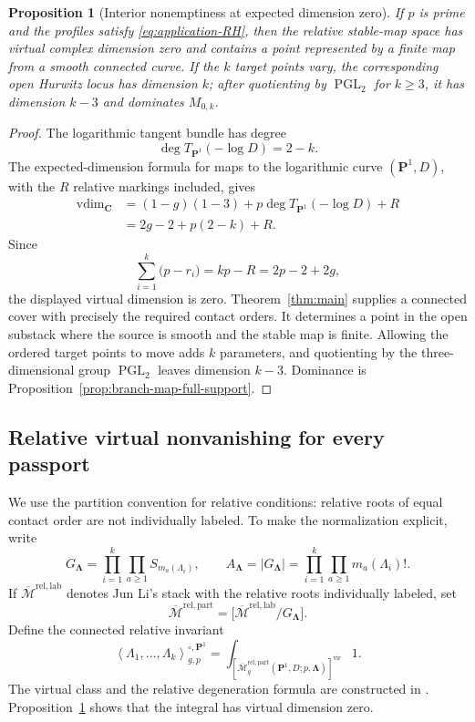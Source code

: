 \documentclass[10pt,a4paper]{amsart}
\newtheorem{proposition}[theorem]{Proposition}
\numberwithin{equation}{section}
\begin{document}
\begin{proposition}[Interior nonemptiness at expected dimension zero]
\label{prop:relative-interior}
If $p$ is prime and the profiles satisfy
\eqref{eq:application-RH}, then the relative stable-map space has virtual
complex dimension zero and contains a point represented by a finite map
from a smooth connected curve.  If the $k$ target points vary, the
corresponding open Hurwitz locus has dimension $k$; after quotienting by
$\operatorname{PGL}_2$ for $k\geq3$, it has dimension $k-3$ and dominates
$M_{0,k}$.
\end{proposition}

\begin{proof}
The logarithmic tangent bundle has degree
\[
 \deg T_{\mathbf P^1}(-\log D)=2-k.
\]
The expected-dimension formula for maps to the logarithmic curve
$(\mathbf P^1,D)$, with the $R$ relative markings included, gives
\begin{align*}
 \operatorname{vdim}_{\mathbf C}
 &= (1-g)(1-3)+p\deg T_{\mathbf P^1}(-\log D)+R\\
 &=2g-2+p(2-k)+R.
\end{align*}
Since
\[
 \sum_{i=1}^k\bigl(p-r_i\bigr)=kp-R=2p-2+2g,
\]
the displayed virtual dimension is zero.  Theorem~\ref{thm:main} supplies a
connected cover with precisely the required contact orders.  It determines
a point in the open substack where the source is smooth and the stable map
is finite.  Allowing the ordered target points to move adds $k$ parameters,
and quotienting by the three-dimensional group $\operatorname{PGL}_2$
leaves dimension $k-3$.  Dominance is
Proposition~\ref{prop:branch-map-full-support}.
\end{proof}

\subsection{Relative virtual nonvanishing for every passport}

We use the partition convention for relative conditions: relative roots of
equal contact order are not individually labeled.  To make the
normalization explicit, write
\[
 G_{\boldsymbol\Lambda}
 =\prod_{i=1}^k\prod_{a\geq1}S_{m_a(\Lambda_i)},
 \qquad
 A_{\boldsymbol\Lambda}=|G_{\boldsymbol\Lambda}|
 =\prod_{i=1}^k\prod_{a\geq1}m_a(\Lambda_i)!.
\]
If $\overline{\mathcal M}^{\mathrm{rel,lab}}$ denotes Jun Li's stack with
the relative roots individually labeled, set
\[
 \overline{\mathcal M}^{\mathrm{rel,part}}
 =\bigl[\overline{\mathcal M}^{\mathrm{rel,lab}}/
        G_{\boldsymbol\Lambda}\bigr].
\]
Define the connected relative invariant
\begin{equation}\label{eq:relative-invariant-definition}
 \left\langle\Lambda_1,\ldots,\Lambda_k
 \right\rangle^{\circ,\mathbf P^1}_{g,p}
 =\int_{[\overline{\mathcal M}^{\mathrm{rel,part}}_{g}
   (\mathbf P^1,D;p,\boldsymbol\Lambda)]^{\mathrm{vir}}}1.
\end{equation}
The virtual class and the relative degeneration formula are constructed in
\cite{JunLiDegeneration}.  Proposition~\ref{prop:relative-interior} shows
that the integral has virtual dimension zero.
\end{document}

